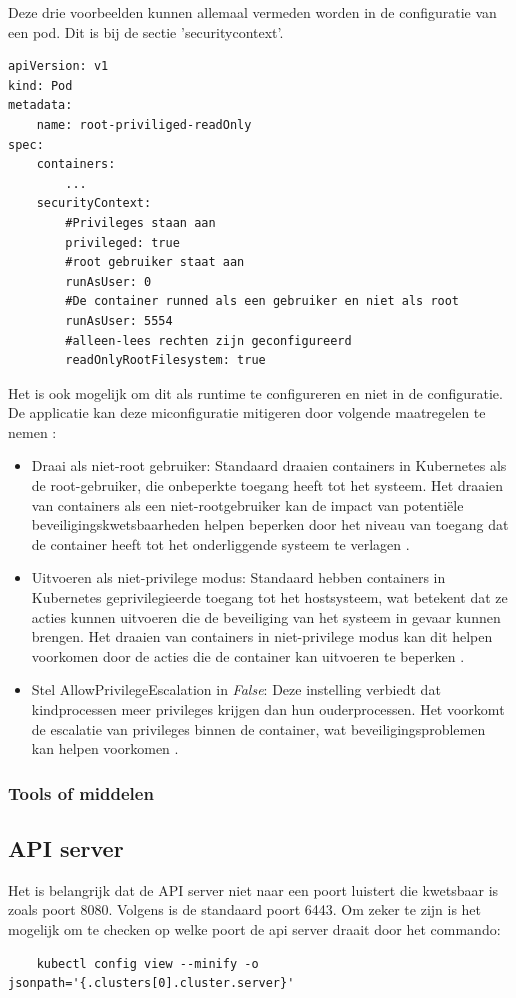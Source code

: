 Deze drie voorbeelden kunnen allemaal vermeden worden in de configuratie van een pod. Dit is bij de sectie 'securitycontext'. 
\begin{verbatim}
apiVersion: v1  
kind: Pod  
metadata:  
    name: root-priviliged-readOnly
spec:  
    containers:  
        ...
    securityContext:  
        #Privileges staan aan 
        privileged: true
        #root gebruiker staat aan
        runAsUser: 0
        #De container runned als een gebruiker en niet als root
        runAsUser: 5554
        #alleen-lees rechten zijn geconfigureerd
        readOnlyRootFilesystem: true
\end{verbatim}

Het is ook mogelijk om dit als runtime te configureren en niet in de configuratie. De applicatie kan deze miconfiguratie mitigeren door volgende maatregelen te nemen \autocite{OWASP-2023}:
\begin{itemize}
    \item Draai als niet-root gebruiker: Standaard draaien containers in Kubernetes als de root-gebruiker, die onbeperkte toegang heeft tot het systeem. Het draaien van containers als een niet-rootgebruiker kan de impact van potentiële beveiligingskwetsbaarheden helpen beperken door het niveau van toegang dat de container heeft tot het onderliggende systeem te verlagen \autocite{OWASP-2023}.
    \item Uitvoeren als niet-privilege modus: Standaard hebben containers in Kubernetes geprivilegieerde toegang tot het hostsysteem, wat betekent dat ze acties kunnen uitvoeren die de beveiliging van het systeem in gevaar kunnen brengen. Het draaien van containers in niet-privilege modus kan dit helpen voorkomen door de acties die de container kan uitvoeren te beperken \autocite{OWASP-2023}.
    \item Stel AllowPrivilegeEscalation in \textit{False}: Deze instelling verbiedt dat kindprocessen meer privileges krijgen dan hun ouderprocessen. Het voorkomt de escalatie van privileges binnen de container, wat beveiligingsproblemen kan helpen voorkomen \autocite{OWASP-2023}.
\end{itemize}



\subsubsection{Tools of middelen}



\subsection{API server}
Het is belangrijk dat de API server niet naar een poort luistert die kwetsbaar is zoals poort 8080. Volgens \autocite{KubernetesDocs-2023} is de standaard poort 6443. Om zeker te zijn is het mogelijk om te checken op welke poort de api server draait door het commando:
\begin{verbatim}
    kubectl config view --minify -o jsonpath='{.clusters[0].cluster.server}'
\end{verbatim}

